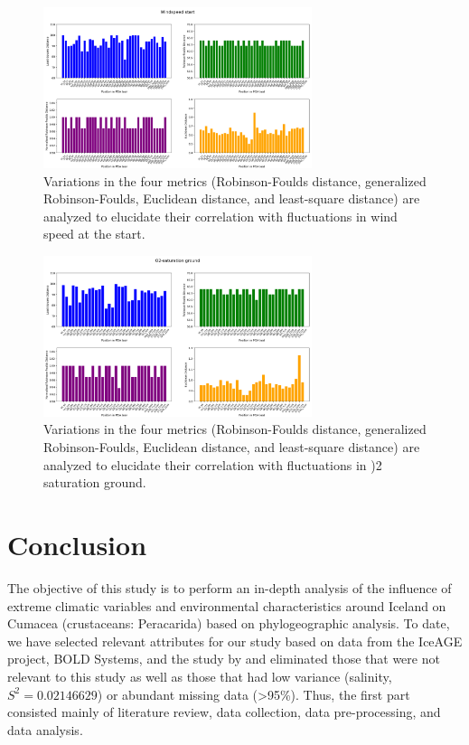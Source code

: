 \begin{figure}[]
    \centering
    \includegraphics[width=0.7\textwidth]{figure5.png}
    \caption{Variations in the four metrics (Robinson-Foulds distance, generalized Robinson-Foulds, Euclidean distance, and least-square distance) are analyzed to elucidate their correlation with fluctuations in wind speed at the start. \label{fig:fig5}}
\end{figure}

\begin{figure}[]
    \centering
    \includegraphics[width=0.7\textwidth]{figure6.png}
    \caption{Variations in the four metrics (Robinson-Foulds distance, generalized Robinson-Foulds, Euclidean distance, and least-square distance) are analyzed to elucidate their correlation with fluctuations in )2 saturation ground. \label{fig:fig6}}
\end{figure}



\section{Conclusion}\label{conclusion}

The objective of this study is to perform an in-depth analysis of the influence of extreme climatic variables and environmental characteristics around Iceland on Cumacea (crustaceans: Peracarida) based on phylogeographic analysis. To date, we have selected relevant attributes for our study based on data from the IceAGE project, BOLD Systems, and the study by \cite{uhlir_adding_2021} and eliminated those that were not relevant to this study as well as those that had low variance (salinity, \( S^2 = 0.02146629 \)) or abundant missing data (>95\%). Thus, the first part consisted mainly of literature review, data collection, data pre-processing, and data analysis.
